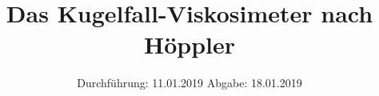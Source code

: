 

\subject{V207}
\title{Das Kugelfall-Viskosimeter nach Höppler}
\date{
  Durchführung: 11.01.2019
  \hspace{3em}
  Abgabe: 18.01.2019
}



\maketitle
\thispagestyle{empty}
\tableofcontents
\newpage



%
 
 


\printbibliography{}


